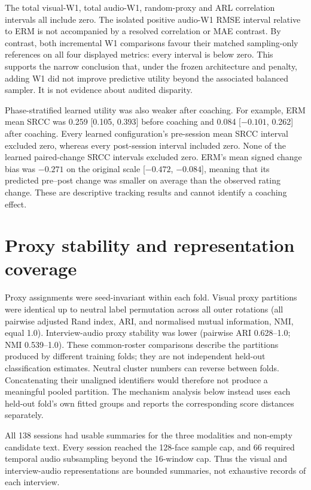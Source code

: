 The total visual-W1, total audio-W1, random-proxy and ARL correlation intervals all include zero.
The isolated positive audio-W1 RMSE interval relative to ERM is not accompanied by a resolved
correlation or MAE contrast. By contrast, both incremental W1 comparisons favour their matched
sampling-only references on all four displayed metrics: every interval is below zero. This
supports the narrow conclusion that, under the frozen architecture and penalty, adding W1 did not
improve predictive utility beyond the associated balanced sampler. It is not evidence about
audited disparity.

Phase-stratified learned utility was also weaker after coaching. For example, ERM mean SRCC was
0.259 [0.105, 0.393] before coaching and 0.084 [$-0.101$, 0.262] after coaching.
Every learned configuration's pre-session mean SRCC interval excluded zero, whereas every
post-session interval included zero. None of the learned paired-change SRCC intervals excluded
zero. ERM's mean signed change bias was $-0.271$ on the original scale
[$-0.472$, $-0.084$], meaning that its predicted pre--post change was smaller on average than
the observed rating change. These are descriptive tracking results and cannot identify a coaching
effect.

\section{Proxy stability and representation coverage}

Proxy assignments were seed-invariant within each fold. Visual proxy partitions were identical up to neutral
label permutation across all outer rotations (all pairwise adjusted Rand index, ARI, and normalised mutual information, NMI, equal
1.0). Interview-audio proxy stability was lower (pairwise ARI 0.628--1.0; NMI
0.539--1.0). These common-roster comparisons describe the partitions produced by different
training folds; they are not independent held-out classification estimates. Neutral cluster
numbers can reverse between folds. Concatenating their unaligned identifiers would therefore
not produce a meaningful pooled partition. The mechanism analysis below instead uses each
held-out fold's own fitted groups and reports the corresponding score distances separately.

All 138 sessions had usable summaries for the three modalities and non-empty candidate text.
Every session reached the 128-face sample cap, and 66 required temporal audio subsampling beyond
the 16-window cap. Thus the visual and interview-audio representations are bounded summaries,
not exhaustive records of each interview.

